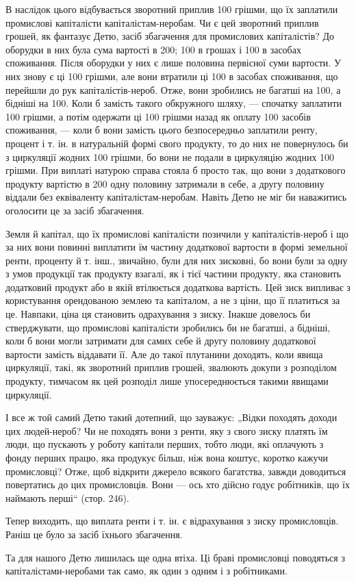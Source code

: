 
В наслідок цього відбувається зворотний приплив 100 грішми, що їх заплатили промислові
капіталісти капіталістам-неробам. Чи є цей зворотний приплив грошей, як фантазує Детю, засіб
збагачення для промислових капіталістів? До оборудки в них була сума вартості в 200; 100 в грошах і 100 в засобах споживання. Після оборудки у них є лише половина
первісної суми вартости. У них знову є ці 100 грішми, але вони втратили ці 100 в
засобах споживання, що перейшли до рук капіталістів-нероб. Отже, вони зробились не багатші на 100, а бідніші на 100. Коли б замість такого обкружного шляху, — спочатку заплатити 100 грішми, а потім одержати ці 100 грішми назад як оплату 100 засобів
споживання, — коли б вони замість цього безпосередньо заплатили ренту, процент і т. ін. в
натуральній формі свого продукту, то до них не повернулось би з циркуляції жодних 100
грішми, бо вони не подали в циркуляцію жодних 100 грішми. При виплаті натурою справа
стояла б просто так, що вони з додаткового продукту вартістю в 200 одну половину затримали
в себе, а другу половину віддали без еквіваленту капіталістам-неробам. Навіть Детю не міг би
наважитись оголосити це за засіб збагачення.

Земля й капітал, що їх промислові капіталісти позичили у капіталістів-нероб і що за них вони повинні
виплатити їм частину додаткової вартости в формі земельної ренти, проценту й т. інш., звичайно, були
для них зисковні, бо вони були за одну з умов продукції так продукту взагалі, як і тієї частини
продукту, яка становить додатковий продукт або в якій втілюється додаткова вартість. Цей зиск
випливає з користування орендованою землею та капіталом, а не з ціни, що її платиться за це.
Навпаки, ціна ця становить одрахування з зиску. Інакше довелось би стверджувати, що промислові
капіталісти зробились би не багатші, а бідніші, коли б вони могли затримати для самих себе й другу
половину додаткової вартости замість віддавати її. Але до такої плутанини доходять, коли явища
циркуляції, такі, як зворотний приплив грошей, звалюють докупи з розподілом продукту, тимчасом як
цей розподіл лише упосереднюється такими явищами циркуляції.

І все ж той самий Детю такий дотепний, що зауважує: „Відки походять доходи цих людей-нероб? Чи не
походять вони з ренти, яку з свого зиску платять їм люди, що пускають у роботу капітали перших,
тобто люди, які оплачують з фонду перших працю, яка продукує більш, ніж вона коштує, коротко кажучи
промисловці? Отже, щоб відкрити джерело всякого багатства, завжди доводиться повертатись до цих
промисловців. Вони — ось хто дійсно годує робітників, що їх наймають перші“ (стор. 246).

Тепер виходить, що виплата ренти і т. ін. є відрахування з зиску промисловців. Раніш це було за
засіб їхнього збагачення.

Та для нашого Детю лишилась ще одна втіха. Ці браві промисловці поводяться з капіталістами-неробами
так само, як один з одним і з робітниками.
\parbreak{}  %
